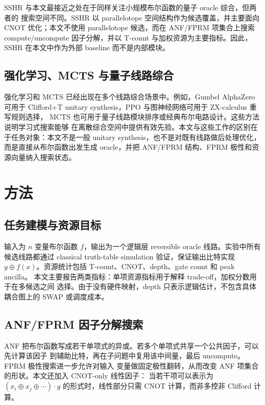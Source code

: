 \documentclass[UTF8,fontset=macnew,11pt]{ctexart}
\begin{document}
SSHR 与本文最接近之处在于同样关注小规模布尔函数的量子 oracle 综合，但两者的
搜索空间不同。SSHR 以 parallelotope 空间结构作为候选覆盖，并主要面向 CNOT
优化；本文不使用 parallelotope 候选，而在 ANF/FPRM 项集合上搜索 compute/uncompute
因子分解，并以 T-count 与加权资源为主要指标。因此，SSHR 在本文中作为外部 baseline
而不是内部模块。

\subsection{强化学习、MCTS 与量子线路综合}

强化学习和 MCTS 已经出现在多个线路综合场景中。例如，Gumbel AlphaZero 可用于
Clifford+T unitary synthesis，PPO 与图神经网络可用于 ZX-calculus 重写规则选择，
MCTS 也可用于量子线路模块排序或经典布尔电路设计。这些方法说明学习式搜索能够
在离散综合空间中提供有效先验。本文与这些工作的区别在于任务对象：本文不是一般
unitary synthesis，也不是对既有线路做后处理优化，而是直接从布尔函数出发生成
oracle，并把 ANF/FPRM 结构、FPRM 极性和资源向量纳入搜索状态。

\section{方法}

\subsection{任务建模与资源目标}

输入为 $n$ 变量布尔函数 $f$，输出为一个逻辑层 reversible oracle 线路。实验中所有
候选线路都通过 classical truth-table simulation 验证，保证输出比特实现
$y\oplus f(x)$。资源统计包括 T-count、CNOT、depth、gate count 和 peak ancilla。
本文主要报告两类指标：单项资源指标用于解释 trade-off，加权分数用于在多候选之间
选择。由于没有硬件映射，depth 只表示逻辑估计，不包含具体耦合图上的 SWAP 或调度成本。

\subsection{ANF/FPRM 因子分解搜索}

ANF 把布尔函数写成若干单项式的异或。若多个单项式共享一个公共因子，可以先计算该因子
到辅助比特，再在子问题中复用该中间量，最后 uncompute。FPRM 极性搜索进一步允许对输入
变量做固定极性翻转，从而改变 ANF 项集合的形状。本文还加入 CNOT-only 线性因子：
当若干项可以表示为 $(x_i\oplus x_j\oplus\cdots)\cdot g$ 的形式时，线性部分只需
CNOT 计算，而非多控非 Clifford 计算。
\end{document}
